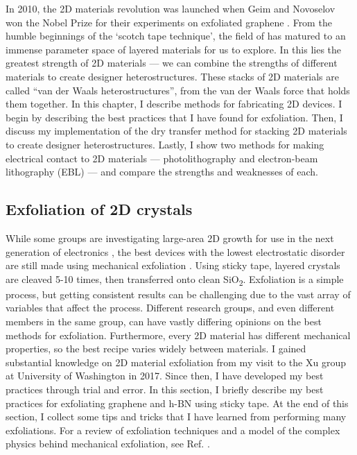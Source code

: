 \documentclass[double,12pt,1in]{beavtex}
\begin{document}
In 2010, the 2D materials revolution was launched when Geim and Novoselov won the Nobel Prize for their experiments on exfoliated graphene \cite{novoselov_electric_2004}. From the humble beginnings of the ‘scotch tape technique’, the field of has matured to an immense parameter space of layered materials for us to explore. In this lies the greatest strength of 2D materials — we can combine the strengths of different materials to create designer heterostructures. These stacks of 2D materials are called “van der Waals heterostructures”, from the van der Waals force that holds them together. In this chapter, I describe methods for fabricating 2D devices. I begin by describing the best practices that I have found for exfoliation. Then, I discuss my implementation of the dry transfer method for stacking 2D materials to create designer heterostructures. Lastly, I show two methods for making electrical contact to 2D materials — photolithography and electron-beam lithography (EBL) — and compare the strengths and weaknesses of each.

\subsection{Exfoliation of 2D crystals}

While some groups are investigating large-area 2D growth for use in the next generation of electronics \cite{quellmalz_large-area_2021}, the best devices with the lowest electrostatic disorder are still made using mechanical exfoliation \cite{xin_giant_2023}. Using sticky tape, layered crystals are cleaved 5-10 times, then transferred onto clean SiO\textsubscript{2}. Exfoliation is a simple process, but getting consistent results can be challenging due to the vast array of variables that affect the process. Different research groups, and even different members in the same group, can have vastly differing opinions on the best methods for exfoliation. Furthermore, every 2D material has different mechanical properties, so the best recipe varies widely between materials. I gained substantial knowledge on 2D material exfoliation from my visit to the Xu group at University of Washington in 2017. Since then, I have developed my best practices through trial and error. In this section, I briefly describe my best practices for exfoliating graphene and h-BN using sticky tape. At the end of this section, I collect some tips and tricks that I have learned from performing many exfoliations. For a review of exfoliation techniques and a model of the complex physics behind mechanical exfoliation, see Ref. \cite{islam_exfoliation_2022}.
\end{document}

